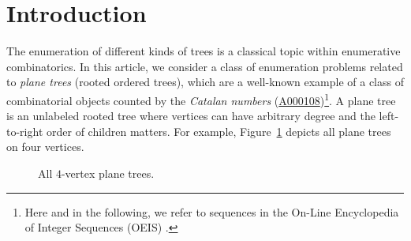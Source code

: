 \documentclass[12pt]{amsart}
\newcommand{\seqnum}[1]{\href{https://oeis.org/#1}{#1}}
\begin{document}
\maketitle



\section{Introduction}\label{sec:intro}

The enumeration of different kinds of trees is a classical topic within enumerative combinatorics. In this article, we consider a class of enumeration problems related to \emph{plane trees} (rooted ordered trees), which are a well-known example of a class of combinatorial objects counted by the \emph{Catalan numbers} (\seqnum{A000108})\footnote{Here and in the following, we refer to sequences in the On-Line Encyclopedia of Integer Sequences (OEIS) \cite{OEIS}.}. A plane tree is an unlabeled rooted tree where vertices can have arbitrary degree and the left-to-right order of children matters. For example, Figure~\ref{fig:plane-4} depicts all plane trees on four vertices.
\begin{figure}[htbp]
 \caption{All $4$-vertex plane trees.}\label{fig:plane-4}
\end{figure}
\end{document}
